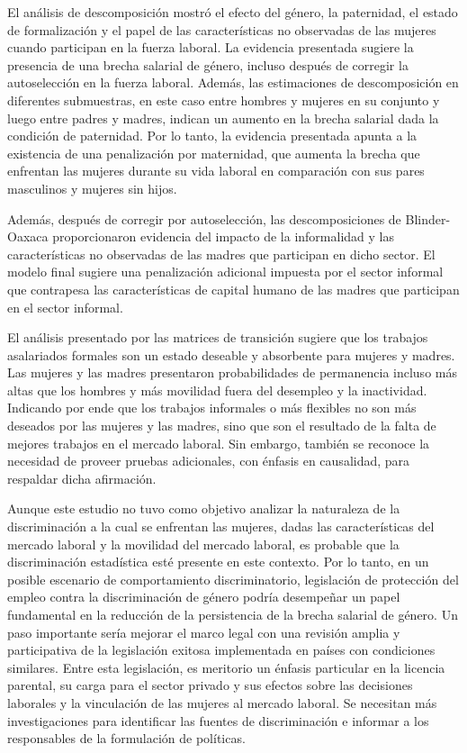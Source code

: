 El análisis de descomposición mostró el efecto del género, la paternidad, el estado de formalización y el papel de las características no observadas de las mujeres cuando participan en la fuerza laboral. La evidencia presentada sugiere la presencia de una brecha salarial de género, incluso después de corregir la autoselección en la fuerza laboral. Además, las estimaciones de descomposición en diferentes submuestras, en este caso entre hombres y mujeres en su conjunto y luego entre padres y madres, indican un aumento en la brecha salarial dada la condición de paternidad. Por lo tanto, la evidencia presentada apunta a la existencia de una penalización por maternidad, que aumenta la brecha que enfrentan las mujeres durante su vida laboral en comparación con sus pares masculinos y mujeres sin hijos.

Además, después de corregir por autoselección, las descomposiciones de Blinder-Oaxaca proporcionaron evidencia del impacto de la informalidad y las características no observadas de las madres que participan en dicho sector. El modelo final sugiere una penalización adicional impuesta por el sector informal que contrapesa las características de capital humano de las madres que participan en el sector informal.

El análisis presentado por las matrices de transición sugiere que los trabajos asalariados formales son un estado deseable y absorbente para mujeres y madres. Las mujeres y las madres presentaron probabilidades de permanencia incluso más altas que los hombres y más movilidad fuera del desempleo y la inactividad. Indicando por ende que los trabajos informales o más flexibles no son más deseados por las mujeres y las madres, sino que son el resultado de la falta de mejores trabajos en el mercado laboral. Sin embargo, también se reconoce la necesidad de proveer pruebas adicionales, con énfasis en causalidad, para respaldar dicha afirmación.

Aunque este estudio no tuvo como objetivo analizar la naturaleza de la discriminación a la cual se enfrentan las mujeres, dadas las características del mercado laboral y la movilidad del mercado laboral, es probable que la discriminación estadística esté presente en este contexto. Por lo tanto, en un posible escenario de comportamiento discriminatorio, legislación de protección del empleo contra la discriminación de género podría desempeñar un papel fundamental en la reducción de la persistencia de la brecha salarial de género. Un paso importante sería mejorar el marco legal con una revisión amplia y participativa de la legislación exitosa implementada en países con condiciones similares. Entre esta legislación, es meritorio un énfasis particular en la licencia parental, su carga para el sector privado y sus efectos sobre las decisiones laborales y la vinculación de las mujeres al mercado laboral. Se necesitan más investigaciones para identificar las fuentes de discriminación e informar a los responsables de la formulación de políticas.

